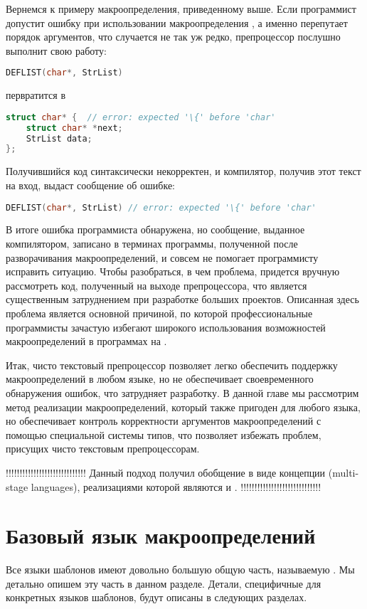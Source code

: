 Вернемся к примеру макроопределения, приведенному выше. Если программист допустит ошибку при использовании макроопределения , а именно перепутает порядок аргументов, что случается не так уж редко, препроцессор послушно выполнит свою работу:
\begin{lstlisting}[language=C]
DEFLIST(char*, StrList)
\end{lstlisting}
первратится в
\begin{lstlisting}[language=C]
struct char* {  // error: expected '\{' before 'char'
    struct char* *next; 
    StrList data; 
};
\end{lstlisting}
Получившийся код синтаксически некорректен, и компилятор, получив этот текст на вход, выдаст сообщение об ошибке:
\begin{lstlisting}[language=C]
DEFLIST(char*, StrList) // error: expected '\{' before 'char'
\end{lstlisting}
В итоге ошибка программиста обнаружена, но сообщение, выданное компилятором, записано в терминах программы, полученной после разворачивания макроопределений, и совсем не помогает программисту исправить ситуацию. Чтобы разобраться, в чем проблема, придется вручную рассмотреть код, полученный на выходе препроцессора, что является существенным затруднением при разработке больших проектов.
Описанная здесь проблема является основной причиной, по которой профессиональные программисты зачастую избегают широкого использования возможностей макроопределений в программах на  \cite{CodeComplete}. 

Итак, чисто текстовый препроцессор позволяет легко обеспечить поддержку макроопределений в любом языке, но не обеспечивает своевременного обнаружения ошибок, что затрудняет разработку. В данной главе мы рассмотрим метод реализации макроопределений, который также пригоден для любого языка, но обеспечивает контроль корректности аргументов макроопределений с помощью специальной системы типов, что позволяет избежать проблем, присущих чисто текстовым препроцессорам.

!!!!!!!!!!!!!!!!!!!!!!!!!!!!!
Данный подход получил обобщение в виде концепции  (multi-stage languages), реализациями которой являются  \cite{MacroML} и  \cite{HTMP}.
!!!!!!!!!!!!!!!!!!!!!!!!!!!!!

\section{Базовый язык макроопределений}
Все языки шаблонов имеют довольно большую общую часть, называемую . Мы детально опишем эту часть в данном разделе. Детали, специфичные для конкретных языков шаблонов, будут описаны в следующих разделах.

